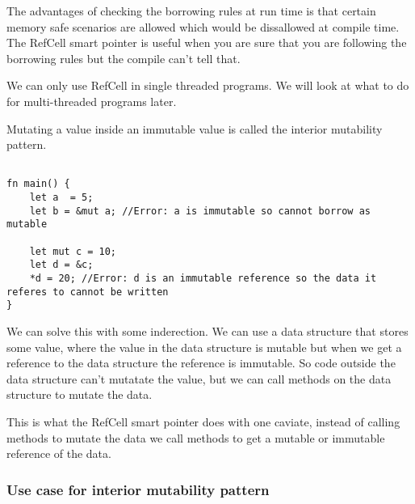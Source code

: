 The advantages of checking the borrowing rules at run time is that certain memory safe scenarios are allowed which would be dissallowed at compile time. The RefCell smart pointer is useful when you are sure that you are following the borrowing rules but the compile can't tell that. 

\begin{remark}
    We can only use RefCell in single threaded programs. We will look at what to do for multi-threaded programs later.
\end{remark}

Mutating a value inside an immutable value is called the interior mutability pattern.

\begin{lstlisting}
    
fn main() {
    let a  = 5;
    let b = &mut a; //Error: a is immutable so cannot borrow as mutable

    let mut c = 10;
    let d = &c;
    *d = 20; //Error: d is an immutable reference so the data it referes to cannot be written
}
\end{lstlisting}

We can solve this with some inderection. We can use a data structure that stores some value, where the value in the data structure is mutable but when we get a reference to the data structure the reference is immutable. So code outside the data structure can't mutatate the value, but we can call methods on the data structure to mutate the data.

This is what the RefCell smart pointer does with one caviate, instead of calling methods to mutate the data we call methods to get a mutable or immutable reference of the data.

\subsubsection{Use case for interior mutability pattern}

